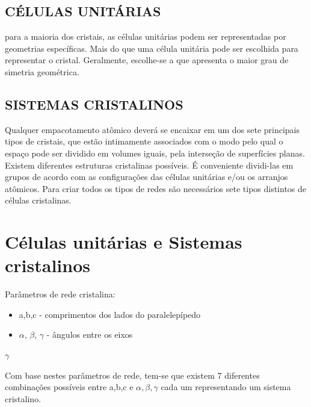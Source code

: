 \subsection*{CÉLULAS UNITÁRIAS} para a maioria dos cristais, as células unitárias podem ser representadas por geometrias específicas. Mais do que uma célula unitária pode ser escolhida para representar o cristal. Geralmente, escolhe-se a que apresenta o maior grau de simetria geométrica.



\subsection*{SISTEMAS CRISTALINOS} Qualquer empacotamento atômico deverá se encaixar em um dos sete principais tipos de cristais, que estão intimamente associados com o modo pelo qual o espaço pode ser dividido em volumes iguais, pela interseção de superfícies planas.
Existem diferentes estruturas cristalinas possíveis. É conveniente dividi-las em grupos de acordo com as configurações das células unitárias e/ou os arranjos atômicos. Para criar todos os tipos de redes são necessários sete tipos distintos de células cristalinas.


\section{Células unitárias e Sistemas cristalinos}

Parâmetros de rede cristalina:
\begin{itemize}
	\item a,b,c - comprimentos dos lados do paralelepípedo
	\item $ \alpha$, $\beta$, $\gamma $ - ângulos entre os eixos
\end{itemize}

$\gamma $





Com base nestes parâmetros de rede, tem-se que existem 7 diferentes combinações possíveis entre a,b,c e $\alpha, \beta, \gamma $ cada um representando um sistema cristalino.


